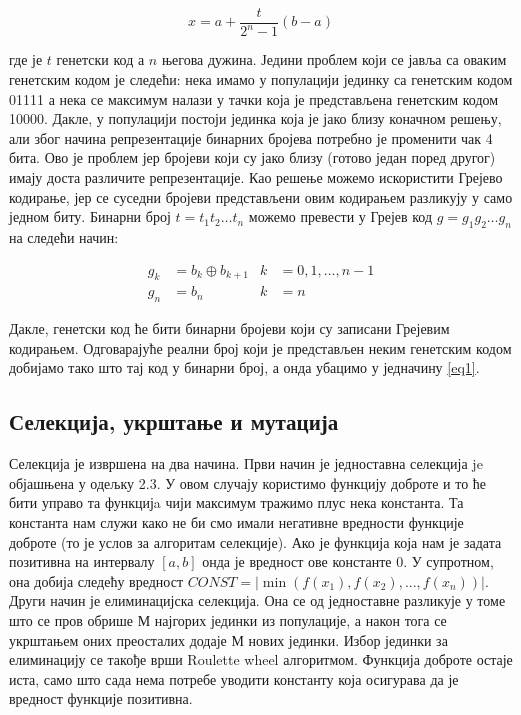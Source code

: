 \documentclass{article}
\begin{document}
\begin{equation} \label{eq1}
    x = a + \frac{t}{2^n - 1} (b - a)
\end{equation}

где је $t$ генетски код а $n$ његова дужина. Једини проблем који се јавља са оваким
генетским кодом је следећи: нека имамо у популацији јединку са генетским кодом 01111 а нека се максимум
налази у тачки која је представљена генетским кодом 10000. Дакле, у популацији постоји
јединка која је јако близу коначном решењу, али због начина репрезентације бинарних 
бројева потребно је променити чак 4 бита. Ово је проблем јер бројеви који су 
јако близу (готово један поред другог) имају доста различите репрезентације. Као решење
можемо искористити Грејево кодирање, јер се суседни бројеви представљени овим кодирањем 
разликују у само једном биту. Бинарни број $t = t_1 t_2 \dots t_n$ можемо превести у 
Грејев код $g = g_1 g_2 \dots g_n$ на следећи начин: 

\begin{align*}
    g_k &= b_k \oplus b_{k + 1} & k &= 0, 1, \dots, n - 1 \\
    g_n &= b_n                   &   k &= n
\end{align*}

Дакле, генетски код ће бити бинарни бројеви који су записани Грејевим кодирањем. 
Одговарајуће реални број који је представљен неким генетским кодом добијамо тако 
што тај код у бинарни број, а онда убацимо у једначину \ref*{eq1}.

\subsection{Селекција, укрштање и мутација}
Селекција је извршена на два начина. Први начин је једноставна селекција je
објашњена у одељку 2.3. У овом случају користимо функцију доброте и то ће бити управо 
та функцијa чији максимум тражимо плус нека константа. Та константа нам служи како не 
би смо имали негативне вредности функције доброте (то је услов за алгоритам селекције). 
Ако је функција која нам је задата позитивна на интервалу $[a, b]$ онда је вредност 
ове константе 0. У супротном, она добија следећу вредност $CONST = |\min(f(x_1), f(x_2), ..., f(x_n))|$.
Други начин је елиминацијска селекција. Она се од једноставне разликује у томе што се пров
обрише $М$ најгорих јединки из популације, а након тога се укрштањем оних преосталих додаје
$М$ нових јединки. Избор јединки за елиминацију се такође врши Roulette wheel алгоритмом.
Функција доброте остаје иста, само што сада нема потребе уводити константу која осигурава да је вредност функције позитивна.
\end{document}
